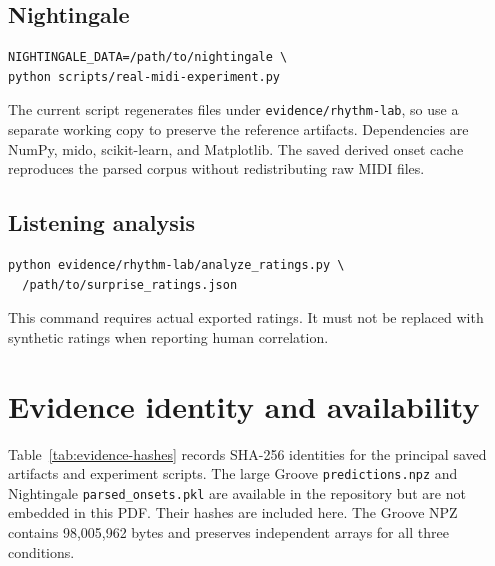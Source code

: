\documentclass[11pt,a4paper]{article}
\begin{document}
\subsection{Nightingale}
\begin{lstlisting}
NIGHTINGALE_DATA=/path/to/nightingale \
python scripts/real-midi-experiment.py
\end{lstlisting}
The current script regenerates files under \texttt{evidence/rhythm-lab}, so use a separate working copy to preserve the reference artifacts. Dependencies are NumPy, mido, scikit-learn, and Matplotlib. The saved derived onset cache reproduces the parsed corpus without redistributing raw MIDI files.

\subsection{Listening analysis}
\begin{lstlisting}
python evidence/rhythm-lab/analyze_ratings.py \
  /path/to/surprise_ratings.json
\end{lstlisting}
This command requires actual exported ratings. It must not be replaced with synthetic ratings when reporting human correlation.

\section{Evidence identity and availability}
Table~\ref{tab:evidence-hashes} records SHA-256 identities for the principal saved artifacts and experiment scripts. The large Groove \texttt{predictions.npz} and Nightingale \texttt{parsed\_onsets.pkl} are available in the repository but are not embedded in this PDF. Their hashes are included here. The Groove NPZ contains 98,005,962 bytes and preserves independent arrays for all three conditions.
\end{document}
